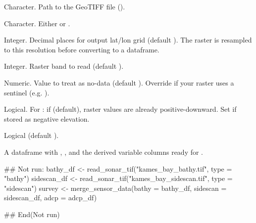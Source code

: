 \documentclass[a4paper]{book}
\begin{document}
\begin{Arguments}
\begin{ldescription}
\item[\code{file}] Character. Path to the GeoTIFF file ().

\item[\code{type}] Character. Either  or .

\item[\code{spatial\_res}] Integer. Decimal places for output lat/lon grid
(default ). The raster is resampled to this resolution before
converting to a dataframe.

\item[\code{band}] Integer. Raster band to read (default ).

\item[\code{nodata\_val}] Numeric. Value to treat as no-data (default ).
Override if your raster uses a sentinel (e.g. ).

\item[\code{depth\_positive}] Logical. For : if  (default),
raster values are already positive-downward. Set  if stored as
negative elevation.

\item[\code{verbose}] Logical (default ).
\end{ldescription}
\end{Arguments}
%
\begin{Value}
A dataframe with , , and the derived variable columns
ready for .
\end{Value}
%
\begin{Examples}
\begin{ExampleCode}
## Not run: 
bathy_df   <- read_sonar_tif("kames_bay_bathy.tif",    type = "bathy")
sidescan_df <- read_sonar_tif("kames_bay_sidescan.tif", type = "sidescan")
survey <- merge_sensor_data(bathy = bathy_df, sidescan = sidescan_df, adcp = adcp_df)

## End(Not run)
\end{ExampleCode}
\end{Examples}
%
\end{document}

